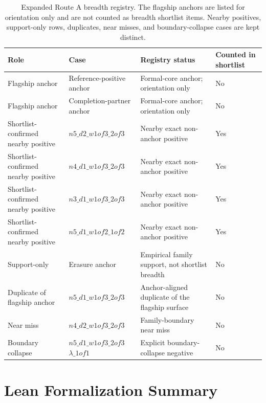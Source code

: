 \documentclass[11pt]{article}
\theoremstyle{definition}
\begin{document}
\begin{table}[p]
\centering
\caption{Expanded Route A breadth registry. The flagship anchors are listed for orientation only and are not counted as breadth shortlist items. Nearby positives, support-only rows, duplicates, near misses, and boundary-collapse cases are kept distinct.}
\label{tab:appendix-route-a-breadth-registry}
\begin{tabular}{p{2.8cm}p{3.8cm}p{4.8cm}p{1.8cm}}
\toprule
Role & Case & Registry status & Counted in shortlist \\
\midrule
Flagship anchor &
Reference-positive anchor &
Formal-core anchor; orientation only &
No \\
\addlinespace
Flagship anchor &
Completion-partner anchor &
Formal-core anchor; orientation only &
No \\
\addlinespace
Shortlist-confirmed nearby positive &
$n5\_d2\_w1of3\_2of3$ &
Nearby exact non-anchor positive &
Yes \\
\addlinespace
Shortlist-confirmed nearby positive &
$n4\_d1\_w1of3\_2of3$ &
Nearby exact non-anchor positive &
Yes \\
\addlinespace
Shortlist-confirmed nearby positive &
$n3\_d1\_w1of3\_2of3$ &
Nearby exact non-anchor positive &
Yes \\
\addlinespace
Shortlist-confirmed nearby positive &
$n5\_d1\_w1of2\_1of2$ &
Nearby exact non-anchor positive &
Yes \\
\addlinespace
Support-only &
Erasure anchor &
Empirical family support, not shortlist breadth &
No \\
\addlinespace
Duplicate of flagship anchor &
$n5\_d1\_w1of3\_2of3$ &
Anchor-aligned duplicate of the flagship surface &
No \\
\addlinespace
Near miss &
$n4\_d2\_w1of3\_2of3$ &
Family-boundary near miss &
No \\
\addlinespace
Boundary collapse &
$n5\_d1\_w1of3\_2of3$\newline$\lambda\_1of1$ &
Explicit boundary-collapse negative &
No \\
\bottomrule
\end{tabular}
\end{table}
  \section{Lean Formalization Summary}
\end{document}
